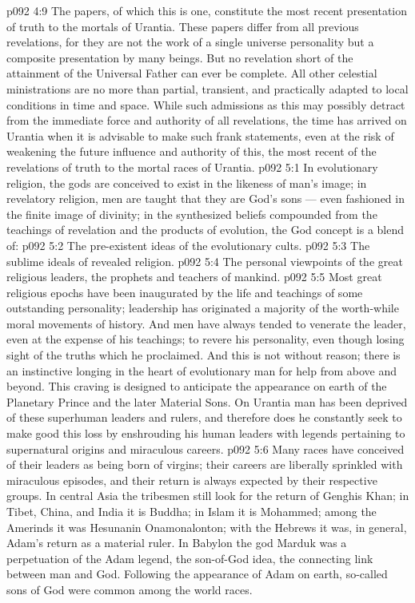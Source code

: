 \vs p092 4:9 \pc {}\bibnobreakspace {} The papers, of which this is one, constitute the most recent presentation of truth to the mortals of Urantia. These papers differ from all previous revelations, for they are not the work of a single universe personality but a composite presentation by many beings. But no revelation short of the attainment of the Universal Father can ever be complete. All other celestial ministrations are no more than partial, transient, and practically adapted to local conditions in time and space. While such admissions as this may possibly detract from the immediate force and authority of all revelations, the time has arrived on Urantia when it is advisable to make such frank statements, even at the risk of weakening the future influence and authority of this, the most recent of the revelations of truth to the mortal races of Urantia.
\vs p092 5:1 In evolutionary religion, the gods are conceived to exist in the likeness of man’s image; in revelatory religion, men are taught that they are God’s sons --- even fashioned in the finite image of divinity; in the synthesized beliefs compounded from the teachings of revelation and the products of evolution, the God concept is a blend of:
\vs p092 5:2 \bibnobreakspace The pre\hyp{}existent ideas of the evolutionary cults.
\vs p092 5:3 \bibnobreakspace The sublime ideals of revealed religion.
\vs p092 5:4 \bibnobreakspace The personal viewpoints of the great religious leaders, the prophets and teachers of mankind.
\vs p092 5:5 \pc Most great religious epochs have been inaugurated by the life and teachings of some outstanding personality; leadership has originated a majority of the worth\hyp{}while moral movements of history. And men have always tended to venerate the leader, even at the expense of his teachings; to revere his personality, even though losing sight of the truths which he proclaimed. And this is not without reason; there is an instinctive longing in the heart of evolutionary man for help from above and beyond. This craving is designed to anticipate the appearance on earth of the Planetary Prince and the later Material Sons. On Urantia man has been deprived of these superhuman leaders and rulers, and therefore does he constantly seek to make good this loss by enshrouding his human leaders with legends pertaining to supernatural origins and miraculous careers.
\vs p092 5:6 Many races have conceived of their leaders as being born of virgins; their careers are liberally sprinkled with miraculous episodes, and their return is always expected by their respective groups. In central Asia the tribesmen still look for the return of Genghis Khan; in Tibet, China, and India it is Buddha; in Islam it is Mohammed; among the Amerinds it was Hesunanin Onamonalonton; with the Hebrews it was, in general, Adam’s return as a material ruler. In Babylon the god Marduk was a perpetuation of the Adam legend, the son\hyp{}of\hyp{}God idea, the connecting link between man and God. Following the appearance of Adam on earth, so\hyp{}called sons of God were common among the world races.
